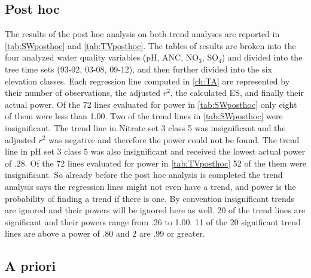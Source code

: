 \subsection{Post hoc}%
The results of the post hoc analysis on both trend analyses are reported in  \autoref{tab:SWposthoc} and \autoref{tab:TVposthoc}.
The tables of results are broken into the four analyzed water quality variables (pH, ANC, NO$_3$, SO$_4$) and divided into the tree time sets (93-02, 03-08, 09-12), and then further divided into the six elevation classes.
Each regression line computed in \autoref{ch:TA} are represented by their number of observations, the adjusted $r^2$, the calculated ES, and finally their actual power.
Of the 72 lines evaluated for power in \autoref{tab:SWposthoc} only eight of them were less than 1.00.
Two of the trend lines in \autoref{tab:SWposthoc} were insignificant.
The trend line in Nitrate set 3 class 5 was insignificant and the adjusted $r^2$ was negative and therefore the power could not be found.
The trend line in pH set 3 class 5 was also insignificant and received the lowest actual power of .28.
Of the 72 lines evaluated for power in \autoref{tab:TVposthoc} 52 of the them were insignificant.
So already before the post hoc analysis is completed the trend analysis says the regression lines might not even have a trend, and power is the probability of finding a trend if there is one.
By convention insignificant trends are ignored and their powers will be ignored here as well.
20 of the trend lines are significant and their powers range from .26 to 1.00.
11 of the 20 significant trend lines are above a power of .80 and 2 are .99 or greater.

\subsection{A priori}
